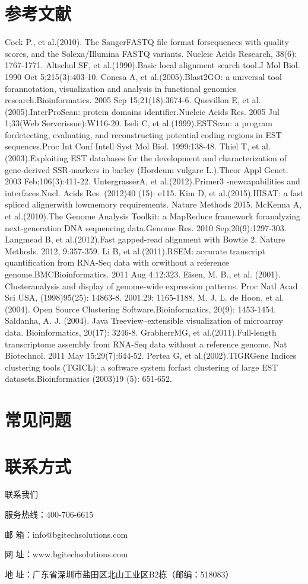 \documentclass[10pt, oneside,a4paper]{article}
\begin{document}
\newpage
\section{参考文献}
\renewcommand\refname{ }
\begin{thebibliography}{20}
Cock P., et al.(2010). The SangerFASTQ file format forsequences with quality scores, and the Solexa/Illumina FASTQ variants. Nucleic Acids Research, 38(6): 1767-1771.
Altschul SF, et al.(1990).Basic local alignment search tool.J Mol Biol. 1990 Oct 5;215(3):403-10.
Conesa A, et al.(2005).Blast2GO: a universal tool forannotation, visualization and analysis in functional genomics research.Bioinformatics. 2005 Sep 15;21(18):3674-6.
Quevillon E, et al.(2005).InterProScan: protein domains identifier.Nucleic Acids Res. 2005 Jul 1;33(Web Serverissue):W116-20.
Iseli C, et al.(1999).ESTScan: a program fordetecting, evaluating, and reconstructing potential coding regions in EST sequences.Proc Int Conf Intell Syst Mol Biol. 1999:138-48.
Thiel T, et al.(2003).Exploiting EST databases for the development and characterization of gene-derived SSR-markers in barley (Hordeum vulgare L.).Theor Appl Genet. 2003
Feb;106(3):411-22.
UntergrasserA, et al.(2012).Primer3 -newcapabilities and interfaces.Nucl. Acids Res. (2012)40 (15): e115.
Kim D, et al.(2015).HISAT: a fast spliced alignerwith lowmemory requirements. Nature Methods 2015.
McKenna A, et al.(2010).The Genome Analysis Toolkit: a MapReduce framework foranalyzing next-generation DNA sequencing data.Genome Res. 2010 Sep;20(9):1297-303.
Langmead B, et al.(2012).Fast gapped-read alignment with Bowtie 2. Nature Methods. 2012, 9:357-359.
Li B, et al.(2011).RSEM: accurate transcript quantification from RNA-Seq data with orwithout a reference genome.BMCBioinformatics. 2011 Aug 4;12:323.
Eisen, M. B., et al. (2001). Clusteranalysis and display of genome-wide expression patterns. Proc Natl Acad Sci USA, (1998)95(25): 14863-8. 2001.29: 1165-1188.
M. J. L. de Hoon, et al. (2004). Open Source Clustering Software.Bioinformatics, 20(9): 1453-1454.
Saldanha, A. J. (2004). Java Treeview--extensible visualization of microarray data. Bioinformatics, 20(17): 3246-8.
GrabherrMG, et al.(2011).Full-length transcriptome assembly from RNA-Seq data without a reference genome. Nat Biotechnol. 2011 May 15;29(7):644-52.
Pertea G, et al.(2002).TIGRGene Indices clustering tools (TGICL): a software system forfast clustering of large EST datasets.Bioinformatics (2003)19 (5): 651-652.
\end{thebibliography}
\newpage
\section{常见问题}
\newpage
\section{联系方式}
联系我们\par
服务热线：400-706-6615\par
邮  箱：info@bgitechsolutions.com\par
网  址：www.bgitechsolutions.com\par
地  址：广东省深圳市盐田区北山工业区B2栋（邮编：518083）\par
\end{document}
